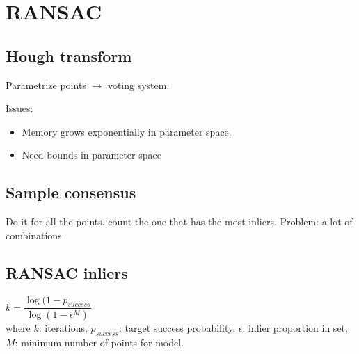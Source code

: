 \section{RANSAC}
\subsection*{Hough transform}
Parametrize points $\rightarrow$ voting system.

Issues:
\begin{itemize}
  \item Memory grows exponentially in parameter space.
  \item Need bounds in parameter space
\end{itemize}

\subsection*{Sample consensus}
Do it for all the points, count the one that has the most inliers.
Problem: a lot of combinations.

\subsection*{RANSAC inliers}
$k = \dfrac{\log(1 - p_{success}}{\log(1 - \epsilon^M)}$\\
where $k$: iterations, $p_{success}$: target success probability,
$\epsilon$: inlier proportion in set, $M$: minimum number of points for
model.

